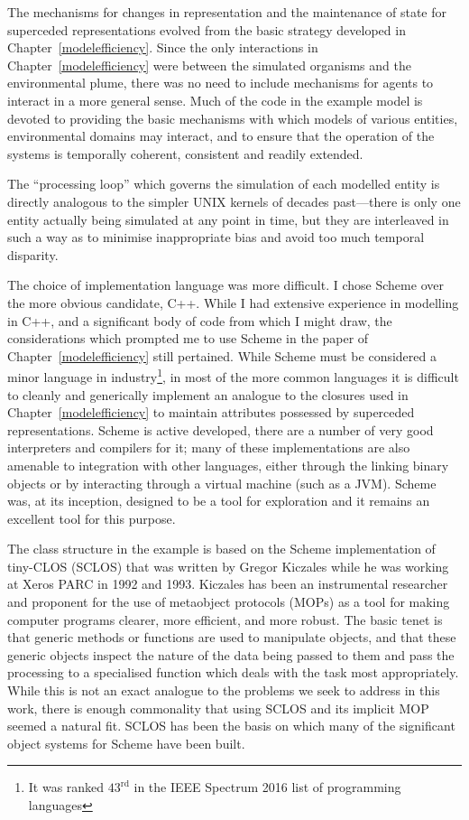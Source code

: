 The mechanisms for changes in representation and the maintenance of
state for superceded representations evolved from the basic strategy
developed in Chapter~\ref{modelefficiency}.  Since the only
interactions in Chapter~\ref{modelefficiency} were between the
simulated organisms and the environmental plume, there was no need to
include mechanisms for agents to interact in a more general
sense. Much of the code in the example model is devoted to providing
the basic mechanisms with which models of various entities,
environmental domains may interact, and to ensure that the operation
of the systems is temporally coherent, consistent and readily
extended. 

The ``processing loop'' which governs the simulation of each modelled
entity is directly analogous to the simpler UNIX kernels of decades
past---there is only one entity actually being simulated at any point
in time, but they are interleaved in such a way as to minimise
inappropriate bias and avoid too much temporal disparity.

The choice of implementation language was more difficult. I chose
\textsf{Scheme} over the more obvious candidate, \textsf{C++}.
While I had extensive experience in modelling in \textsf{C++}, and a significant body of
code from which I might draw, the considerations which prompted me
to use \textsf{Scheme} in the paper of Chapter~\ref{modelefficiency} still
pertained. While \textsf{Scheme} must be considered a minor language in
industry\footnote{It was ranked $43^{\text{rd}}$ in the IEEE Spectrum 2016 list
of programming languages}, in most of the more common languages it
is difficult to cleanly and generically implement an analogue to the
closures used in Chapter~\ref{modelefficiency} to maintain attributes
possessed by superceded representations.  \textsf{Scheme} is active developed,
there are a number of very good interpreters and compilers for it;
many of these implementations are also amenable to integration with
other languages, either through the linking binary objects or by
interacting through a virtual machine (such as a JVM).
\textsf{Scheme} was, at its inception, designed to be a tool for exploration
\cite{sussman1998first} and it remains an excellent tool for this
purpose.

The class structure in the example is based on the \textsf{Scheme}
implementation of \textsf{tiny-CLOS} (\textsf{SCLOS}) that was written
by Gregor Kiczales \cite{kiczales1993xerox} while he was working at
Xeros PARC in 1992 and 1993.  Kiczales has been an instrumental
researcher and proponent for the use of metaobject protocols (MOPs) as
a tool for making computer programs clearer, more efficient, and more
robust.  The basic tenet is that generic methods or functions are used
to manipulate objects, and that these generic objects inspect the
nature of the data being passed to them and pass the processing to a
specialised function which deals with the task most appropriately.
While this is not an exact analogue to the problems we seek to address
in this work, there is enough commonality that using \textsf{SCLOS}
and its implicit MOP seemed a natural fit.  \textsf{SCLOS} has been
the basis on which many of the significant object systems for
\textsf{Scheme} have been built.

